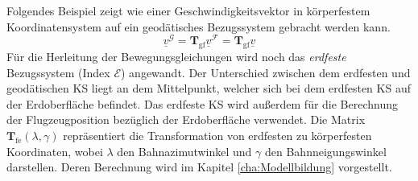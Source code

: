 Folgendes Beispiel zeigt wie einer Geschwindigkeitsvektor in körperfestem Koordinatensystem auf ein geodätisches Bezugssystem gebracht werden kann.\\
\begin{equation*}
\underline{v}^\mathcal{G} = \textbf{T}_\mathrm{gf}\underline{v}^\mathcal{F} = \textbf{T}_\mathrm{gf}\underline{v}
\end{equation*}
Für die Herleitung der Bewegungsgleichungen wird noch das \textit{erdfeste} Bezugssystem (Index $\mathcal{E}$) angewandt. Der Unterschied zwischen dem erdfesten und geodätischen KS liegt an dem Mittelpunkt, welcher sich bei dem erdfesten KS  auf der Erdoberfläche befindet. Das erdfeste KS wird außerdem für die Berechnung der Flugzeugposition bezüglich der Erdoberfläche verwendet. Die Matrix $\textbf{T}_\mathrm{fe}(\lambda,\gamma) $ repräsentiert die Transformation von erdfesten zu körperfesten Koordinaten, wobei $\lambda$ den Bahnazimutwinkel und $\gamma$ den Bahnneigungswinkel darstellen. Deren Berechnung wird im Kapitel \ref{cha:Modellbildung} vorgestellt.
